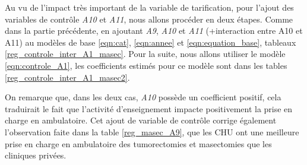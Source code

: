 \clearpage


Au vu de l'impact très important de la variable de tarification, pour l'ajout des variables de contrôle \textit{A10} et \textit{A11}, nous allons procéder en deux étapes. Comme dans la partie précédente, en ajoutant \textit{A9}, \textit{A10} et \textit{A11} (+interaction entre A10 et A11) au modèles de base \ref{eqn:cat}, \ref{eqn:annee} et \ref{eqn:equation_base}, tableaux \ref{reg_controle_inter_A1_masec}. Pour la suite, nous allons utiliser le modèle \ref{eqn:controle_A1}, les coefficients estimés pour ce modèle sont dans les tables \ref{reg_controle_inter_A1_masec2}.

On remarque que, dans les deux cas, \textit{A10} possède un coefficient positif, cela traduirait le fait que l'activité d'enseignement impacte positivement la prise en charge en ambulatoire. Cet ajout de variable de contrôle corrige également l'observation faite dans la table \ref{reg_masec_A9}, que les CHU ont une meilleure prise en charge en ambulatoire des tumorectomies et masectomies que les cliniques privées.\\



